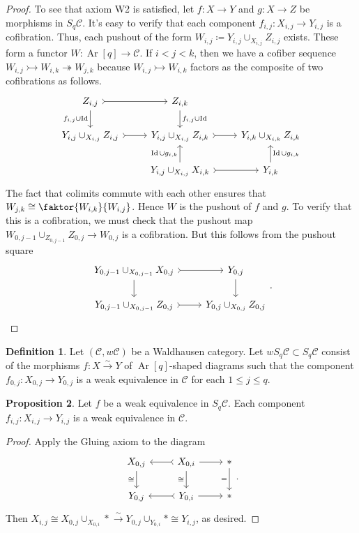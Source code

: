 \documentclass[10pt,letterpaper,cm]{nupset}
\theoremstyle{definition}
\newtheorem{definition}{Definition}
\theoremstyle{theorem}
\newtheorem{prop}[definition]{Proposition}
\theoremstyle{remark}
\newcommand{\1}{\mathbf{1}}
\renewcommand{\c}{\mathscr{C}}
\newcommand{\0}{\vec 0}
\DeclareMathOperator{\id}{Id}
\DeclareMathOperator{\Ar}{Ar}
\begin{document}
\begin{proof}
To see that axiom W2 is satisfied, let $f: X \to Y$ and $g : X \to Z$ be morphisms in $S_q \c$. It's easy to verify that each component $f_{i, j}: X_{i, j} \to Y_{i, j}$ is a cofibration. Thus, each pushout of the form $W_{i, j} \coloneqq Y_{i,j} \cup_{X_{i,j}} Z_{i, j}$ exists.
These form a functor $W: \Ar[q] \to \c$. If $i < j < k$, then we have a cofiber sequence $W_{i,j} \rightarrowtail W_{i, k} \twoheadrightarrow W_{j,k}$ because  $W_{i,j} \rightarrowtail W_{i, k}$ factors as the composite of two cofibrations as follows.
\[
\begin{tikzcd}
{Z_{i,j}} \arrow[d, "{f_{i,j} \cup \id}"'] \arrow[r, tail] & {Z_{i,k}} \arrow[d, "{f_{i,j} \cup \id}"] &  \\
{Y_{i,j} \cup_{X_{i,j}} Z_{i,j}} \arrow[r, tail] & {Y_{i,j} \cup_{X_{i,j}} Z_{i,k}} \arrow[r, tail] & {Y_{i,k} \cup_{X_{i,k}} Z_{i,k}} \\
 & {Y_{i,j} \cup_{X_{i,j}} X_{i,k}} \arrow[u, "{\id \cup g_{i,k}}"] \arrow[r, tail] & {Y_{i,k}} \arrow[u, "{\id \cup g_{i,k}}"']
\end{tikzcd}
\] The fact that colimits commute with each other ensures that $W_{j,k} \cong \faktor{W_{i,k}}{W_{i,j}}$. Hence $W$ is the pushout of $f$ and $g$. To verify that this is a cofibration, we must check that the pushout map $W_{0, j-1} \cup_{Z_{0, j-1}} Z_{0, j} \to W_{0, j}$ is a cofibration. But this follows from the pushout square
\[
\begin{tikzcd}
{Y_{0, j-1}\cup_{X_{0, j-1}} X_{0, j}} \arrow[d] \arrow[r, tail] & {Y_{0, j}} \arrow[d] \\
{Y_{0, j-1}\cup_{X_{0, j-1}} Z_{0, j}} \arrow[r, tail] & {Y_{0, j}\cup_{X_{0, j}} Z_{0, j}}
\end{tikzcd}
.\]
\end{proof}

\begin{definition}
Let $\left(\c, w{\c}\right)$ be a Waldhausen category. Let $w S_q\c \subset S_q \c$ consist of the morphisms $f: X \overset{\sim}{\longrightarrow} Y$ of $\Ar[q]$-shaped diagrams such that the component $f_{0, j} : X_{0, j} \to Y_{0, j}$ is a weak equivalence in $\c$ for each $1\leq j \leq q$.
\end{definition}

\begin{prop}
Let $f$ be a weak equivalence in $S_q \c$.  Each component $f_{i, j}: X_{i, j} \to Y_{i, j}$ is a weak equivalence in $\c$.
\end{prop}
\begin{proof}
Apply the Gluing axiom to the diagram
\[
\begin{tikzcd}
{X_{0, j}} \arrow[d, "\cong"'] & {X_{0, i}} \arrow[l, tail] \arrow[r] \arrow[d, "\cong"'] & \ast \arrow[d, "="'] \\
{Y_{0, j}} & {Y_{0, i}} \arrow[l, tail] \arrow[r] & \ast
\end{tikzcd}.
\] Then $X_{i, j} \cong X_{0, j} \cup_{X_{0, i}} \ast \overset{\sim}{\longrightarrow} Y_{0, j} \cup_{Y_{0, i}} \ast \cong Y_{i, j}$, as desired.
\end{proof}
\end{document}
